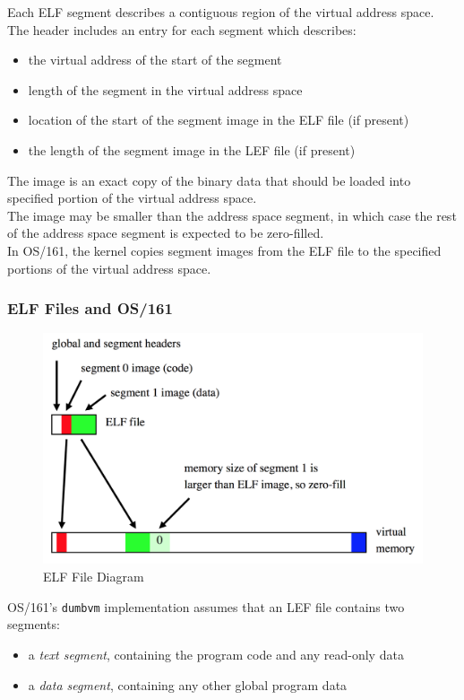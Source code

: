 \documentclass[12pt]{article}
\theoremstyle{plain}
\theoremstyle{definition}
\begin{document}
Each ELF segment describes a contiguous region of the virtual address space. \\

The header includes an entry for each segment which describes:
\begin{itemize}
  \item the virtual address of the start of the segment
  \item length of the segment in the virtual address space
  \item location of the start of the segment image in the ELF file (if present)
  \item the length of the segment image in the LEF file (if present)
\end{itemize}

The image is an exact copy of the binary data that should be loaded into specified portion of the virtual address space. \\

The image may be smaller than the address space segment, in which case the rest of the address space segment is expected to be zero-filled. \\

In OS/161, the kernel copies segment images from the ELF file to the specified portions of the virtual address space.

\subsubsection{ELF Files and OS/161}
\begin{figure}[H]
  \centering
  \includegraphics[scale=0.39]{pictures/elf_diagram.png}
  \caption{ELF File Diagram}
  \label{fig:elf}
\end{figure}
OS/161's \texttt{dumbvm} implementation assumes that an LEF file contains two segments:
\begin{itemize}
  \item a \emph{text segment}, containing the program code and any read-only data
  \item a \emph{data segment}, containing any other global program data
\end{itemize}
\end{document}
